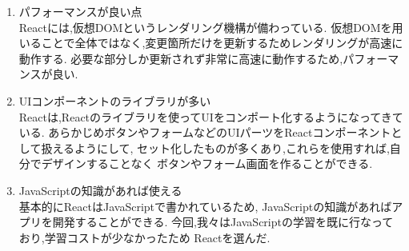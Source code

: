 	\begin{enumerate}
		\item パフォーマンスが良い点 \\
		Reactには,仮想DOMというレンダリング機構が備わっている.
    仮想DOMを用いることで全体ではなく,変更箇所だけを更新するためレンダリングが高速に動作する.
    必要な部分しか更新されず非常に高速に動作するため,パフォーマンスが良い.\\

		\item UIコンポーネントのライブラリが多い \\
		Reactは,Reactのライブラリを使ってUIをコンポート化するようになってきている.
    あらかじめボタンやフォームなどのUIパーツをReactコンポーネントとして扱えるようにして,
    セット化したものが多くあり,これらを使用すれば,自分でデザインすることなく
		ボタンやフォーム画面を作ることができる.\\

		\item JavaScriptの知識があれば使える \\
		基本的にReactはJavaScriptで書かれているため,
		JavaScriptの知識があればアプリを開発することができる.
		今回,我々はJavaScriptの学習を既に行なっており,学習コストが少なかったため
		Reactを選んだ.
	\end{enumerate}
	
